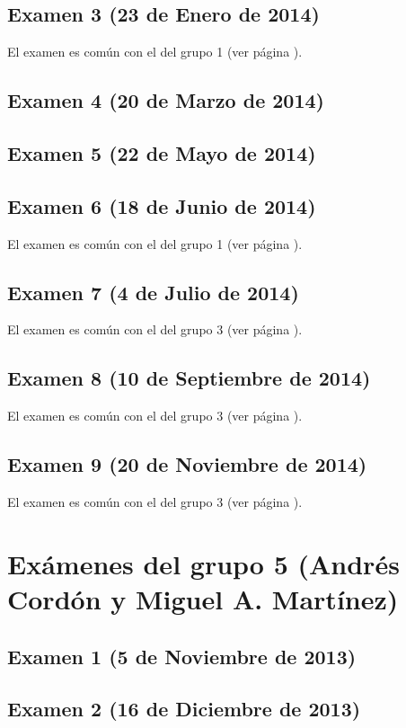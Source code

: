\documentclass[a4paper,12pt,twoside]{book}
\begin{document}
\subsection{Examen 3 (23 de Enero de 2014)}
El examen es común con el del grupo 1 (ver página \pageref{examen_13_14_1_3}).
\subsection{Examen 4 (20 de Marzo de 2014)}
\subsection{Examen 5 (22 de Mayo de 2014)}
\subsection{Examen 6 (18 de Junio de 2014)}
El examen es común con el del grupo 1 (ver página \pageref{examen_13_14_1_6}).
\subsection{Examen 7 (4 de Julio de 2014)}
El examen es común con el del grupo 3 (ver página \pageref{examen_13_14_3_7}). 
\subsection{Examen 8 (10 de Septiembre de 2014)}
El examen es común con el del grupo 3 (ver página \pageref{examen_13_14_3_8}). 
\subsection{Examen 9 (20 de Noviembre de 2014)}
El examen es común con el del grupo 3 (ver página \pageref{examen_13_14_3_9}). 

\section{Exámenes del grupo 5 (Andrés Cordón y Miguel A. Martínez)}
\subsection{Examen 1 (5 de Noviembre de 2013)}
\subsection{Examen 2 (16 de Diciembre de 2013)}
\end{document}
